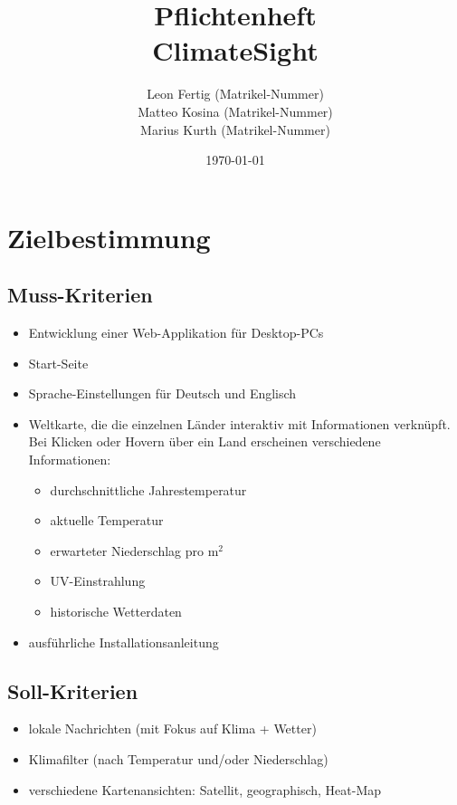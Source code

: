 \documentclass[a4paper]{scrreprt}
\begin{document}
 
\title{Pflichtenheft\\\glqq ClimateSight\grqq}
\author{Leon Fertig (Matrikel-Nummer)\\Matteo Kosina (Matrikel-Nummer) \\Marius Kurth (Matrikel-Nummer)}
\date{\today}
\maketitle


\tableofcontents
 
\chapter{Zielbestimmung}
\section{Muss-Kriterien}
\begin{itemize}
    \item Entwicklung einer Web-Applikation für Desktop-PCs
    \item Start-Seite
    \item Sprache-Einstellungen für Deutsch und Englisch
    \item Weltkarte, die die einzelnen Länder interaktiv mit Informationen verknüpft. Bei Klicken oder Hovern über ein Land erscheinen verschiedene Informationen:
    \begin{itemize}
        \item durchschnittliche Jahrestemperatur
        \item aktuelle Temperatur
        \item erwarteter Niederschlag pro m$^2$
        \item UV-Einstrahlung
        \item historische Wetterdaten
    \end{itemize}
    \item ausführliche Installationsanleitung
\end{itemize}

\section{Soll-Kriterien}
\begin{itemize}
    \item lokale Nachrichten (mit Fokus auf Klima + Wetter)
    \item Klimafilter (nach Temperatur und/oder Niederschlag)
    \item verschiedene Kartenansichten: Satellit, geographisch, Heat-Map
\end{itemize}
\end{document}
